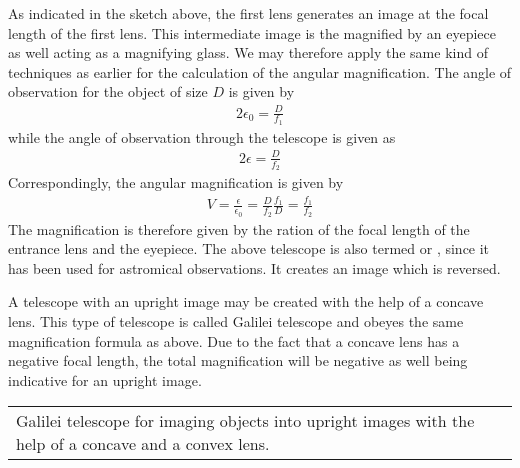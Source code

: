 \documentclass[letterpaper,10pt,english]{sphinxmanual}
\begin{document}
As indicated in the sketch above, the first lens generates an image at the focal length of the first lens. This intermediate image is the magnified by an eye\sphinxhyphen{}piece as well acting as a magnifying glass. We may therefore apply the same kind of techniques as earlier for the calculation of the angular magnification. The angle of observation for the object of size \(D\) is given by
\begin{equation*}
\begin{split}2\epsilon_0=\frac{D}{f_1}\end{split}
\end{equation*}
while the angle of observation through the telescope is given as
\begin{equation*}
\begin{split}2\epsilon=\frac{D}{f_2}\end{split}
\end{equation*}
Correspondingly, the angular magnification is given by
\begin{equation*}
\begin{split}V=\frac{\epsilon}{\epsilon_0}=\frac{D}{f_2}\frac{f_1}{D}=\frac{f_1}{f_2}\end{split}
\end{equation*}
The magnification is therefore given by the ration of the focal length of the entrance lens and the eye\sphinxhyphen{}piece. The above telescope is also termed  or , since it has been used for astromical observations. It creates an image which is reversed.

A telescope with an upright image may be created with the help of a concave lens. This type of telescope is called Galilei telescope and obeyes the same magnification formula as above. Due to the fact that a concave lens has a negative focal length, the total magnification will be negative as well being indicative for an upright image.


\begin{savenotes}\sphinxattablestart
\centering
\begin{tabulary}{\linewidth}[t]{|T|}
\hline
\sphinxstyletheadfamily 
{}
\\
\hline
{} Galilei telescope for imaging objects into upright images with the help of a concave and a convex lens.
\\
\hline
\end{tabulary}
\par
\sphinxattableend\end{savenotes}
\end{document}
